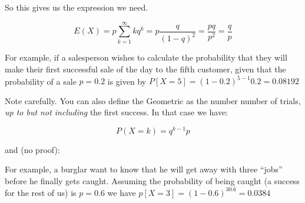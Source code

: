 \documentclass[12pt]{extbook}
\newtheorem{df}{Definition}[section]
\begin{document}
So this gives us the expression we need.

\begin{displaymath}
 E(X) = p \sum_{k=1}^{\infty} k q^k = p \frac{q}{(1-q)^2} = \frac{pq}{p^2} = \frac{q}{p}
\end{displaymath}


  
For example, if a salesperson wishes to calculate the probability that they will make their first successful sale of the day to the fifth customer, given that the probability of a sale $p=0.2$ is given by $P[X=5]=(1-0.2)^{5-1}0.2 = 0.08192$

Note carefully.   You can also define the Geometric as the number number of trials, \emph{up to but not including} the first success.   In that case we have:

\begin{displaymath}
P(X=k) = q^{k-1}p
\end{displaymath}

and (no proof):



For example, a burglar want to know that he will get away with three ``jobs'' before he finally gets caught.  Assuming the probability of being caught (a success for the rest of us) is $p=0.6$ we have $p[X=3]=(1-0.6)^30.6=0.0384$








\end{document}
